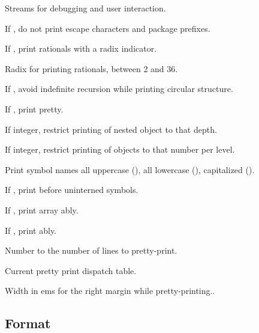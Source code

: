 \begin{LIST}{1cm}
  Streams for debugging and user interaction.

  If \NIL, do not print escape characters and package prefixes.

  If \T, print rationals with a radix indicator.

  Radix for printing rationals, between 2 and 36.

  If \T, avoid indefinite recursion while printing circular
  structure. 

  If \T, print pretty.

  If integer, restrict printing of nested object to that depth.

  If integer, restrict printing of objects to that number per level.

  Print symbol names all uppercase (), all lowercase
  (), capitalized ().

  If \T, print \kwd{:\#} before uninterned symbols.

  If \T, print array ably.

  If \T, print ably.

  Number to the number of lines to pretty-print.


  Current pretty print dispatch table.

  Width in ems for the right margin while pretty-printing..

\end{LIST}



\subsection{Format}
\label{section:Format}

